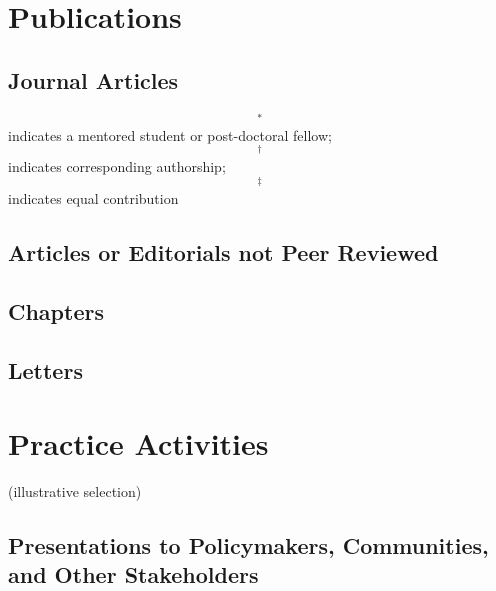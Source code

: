 \documentclass[12pt, martgin, line]{article}
\begin{document}
\section*{Publications}
\subsection*{Journal Articles}

\begin{footnotesize}
	$$^*$$ indicates a mentored student or post-doctoral fellow;
  $$^\dagger$$ indicates corresponding authorship;
  $$^\ddagger$$ indicates equal contribution  
\end{footnotesize}

\begin{enumerate}
  
\end{enumerate}

\subsection*{Articles or Editorials not Peer Reviewed}

\begin{enumerate}
  
\end{enumerate}


\subsection*{Chapters}

\begin{enumerate}
 
\end{enumerate}

\subsection*{Letters}

\begin{enumerate}
  
\end{enumerate}


\section*{Practice Activities}

(illustrative selection)

\subsection*{Presentations to Policymakers, Communities, and Other Stakeholders}
\end{document}

